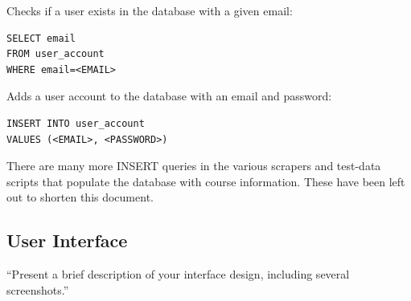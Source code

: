 \documentclass[twoside=false,a4paper,11pt]{article}
\theoremstyle{mytheor}
\begin{document}
Checks if a user exists in the database with a given email:
\begin{lstlisting}
SELECT email
FROM user_account
WHERE email=<EMAIL>
\end{lstlisting}

Adds a user account to the database with an email and password:
\begin{lstlisting}
INSERT INTO user_account
VALUES (<EMAIL>, <PASSWORD>)
\end{lstlisting}

There are many more INSERT queries in the various scrapers and test-data scripts that populate the database with course information. These have been left out to shorten this document.

\subsection*{User Interface}

``Present a brief description of your interface design, including several screenshots.''
\end{document}
